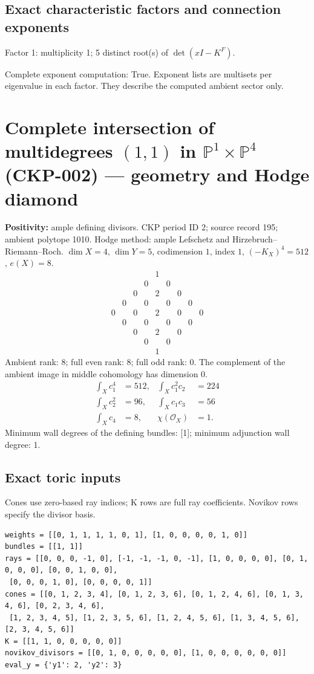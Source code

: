 \documentclass[10pt,a4paper]{article}
\newcommand{\hodge}[4]{\begin{array}{ccccccccc}
&&&&1&&&&\\&&&0&&0&&&\\&&0&&#1&&0&&\\&0&&#2&&#2&&0&\\
0&&#3&&#4&&#3&&0\\&0&&#2&&#2&&0&\\&&0&&#1&&0&&\\&&&0&&0&&&\\&&&&1&&&&\end{array}}
\newcommand{\fitmath}[1]{\sbox{\mathbox}{$\displaystyle #1$}\ifdim\wd\mathbox>\linewidth\resizebox{\linewidth}{!}{\usebox{\mathbox}}\else\usebox{\mathbox}\fi}
\begin{document}
\subsection*{Exact characteristic factors and connection exponents}
Factor 1: multiplicity 1; 5 distinct root(s) of $\det(xI-K^F)$.
\begin{center}\fitmath{\begin{aligned}p_{1}(x)&=x^{5} + 6250\end{aligned}}\end{center}
\begin{center}\fitmath{\text{Powers}=\{0\}}\end{center}
\begin{center}\fitmath{\text{Classes modulo }\mathbb Z=\{0\}}\end{center}
Complete exponent computation: True.
Exponent lists are multisets per eigenvalue in each factor. They describe the computed ambient sector only.
\clearpage\section*{Complete intersection of multidegrees $(1,1)$ in $\mathbb P^{1}\times \mathbb P^{4}$ (CKP-002) --- geometry and Hodge diamond}\label{entry:CKP-002}
\textbf{Positivity:} ample defining divisors.
CKP period ID 2; source record 195; ambient polytope 1010.
Hodge method: ample Lefschetz and Hirzebruch--Riemann--Roch.
$\dim X=4$, $\dim Y=5$, codimension $1$, index $1$, $(-K_X)^4=512$, $e(X)=8$.
\[\hodge{2}{0}{0}{2}\]
Ambient rank: 8; full even rank: 8; full odd rank: 0. The complement of the ambient image in middle cohomology has dimension 0.
\[\begin{aligned}\int_Xc_1^4&=512,&\int_Xc_1^2c_2&=224\\\int_Xc_2^2&=96,&\int_Xc_1c_3&=56\\\int_Xc_4&=8,&\chi(\mathcal O_X)&=1.\end{aligned}\]
Minimum wall degrees of the defining bundles: [1]; minimum adjunction wall degree: 1.
\subsection*{Exact toric inputs}
Cones use zero-based ray indices; K rows are full ray coefficients. Novikov rows specify the divisor basis.

\begin{lstlisting}
weights = [[0, 1, 1, 1, 1, 0, 1], [1, 0, 0, 0, 0, 1, 0]]
bundles = [[1, 1]]
rays = [[0, 0, 0, -1, 0], [-1, -1, -1, 0, -1], [1, 0, 0, 0, 0], [0, 1, 0, 0, 0], [0, 0, 1, 0, 0],
 [0, 0, 0, 1, 0], [0, 0, 0, 0, 1]]
cones = [[0, 1, 2, 3, 4], [0, 1, 2, 3, 6], [0, 1, 2, 4, 6], [0, 1, 3, 4, 6], [0, 2, 3, 4, 6],
 [1, 2, 3, 4, 5], [1, 2, 3, 5, 6], [1, 2, 4, 5, 6], [1, 3, 4, 5, 6], [2, 3, 4, 5, 6]]
K = [[1, 1, 0, 0, 0, 0, 0]]
novikov_divisors = [[0, 1, 0, 0, 0, 0, 0], [1, 0, 0, 0, 0, 0, 0]]
eval_y = {'y1': 2, 'y2': 3}
\end{lstlisting}
\end{document}
